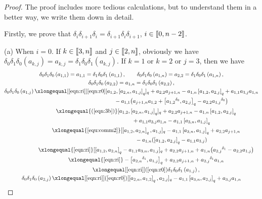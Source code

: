 \documentclass[pdftex]{sigma}
\numberwithin{equation}{section}
\def\lr#1{\left[#1\right]}
\def\lrb#1{\left(#1\right)}
\def\d{\delta}
\def\lbb#1{\left[\kern-0.15em\left[ {#1} \right] \kern-0.15em\right]}
\begin{document}
\begin{proof}
The proof includes more tedious calculations, but to understand them
in a better way, we write them down in detail.

Firstly, we prove that $\d_i\d_{i+1}\d_i=\d_{i+1 }\d_i\d_{i+1}$, $i \in \lbb{0,n-2}$.

(a) When $i=0$.
If $k \in \lbb{3,n}$ and $j\in\lbb{2,n}$, obviously we have
$\d_0\d_1\d_0\lrb{a_{k,j}}=a_{k,j}=\d_1\d_0\d_1\lrb{a_{k,j}}$.
If $k=1$ or $k=2$ or $j=3$, then we have
\begin{gather*}
 \d_0\d_1\d_0\lrb{a_{1,1}} =a_{1,1}=\d_1\d_0\d_1\lrb{a_{1,1}},\qquad
 \d_0\d_1\d_0\lrb{a_{1,n}}=a_{2,2}=\d_1\d_0\d_1\lrb{a_{1,n}},\\
 \d_0\d_1\d_0\lrb{a_{2,2}}=a_{1,n}=\d_1\d_0\d_1\lrb{a_{2,2}},\\
 \d_0\d_1\d_0\lrb{a_{1,j}}
 \xlongequal[\eqref{eqn:ri}]{\eqref{eqn:r0}} [a_{1,2},\lr{a_{2,n}, a_{1,j}}_q]_q+a_{2,2}a_{j+1,n}-a_{1,n}\lr{a_{1,2}, a_{2,j}}_q +a_{1,1}a_{3,j}a_{1,n} \\
\phantom{ \d_0\d_1\d_0\lrb{a_{1,j}}\xlongequal{\qquad}}{} -a_{1,1}\bigl(a_{j+1,n}a_{1,2}+\bigl[{a_{1,2}}^{\d_0}, a_{2,j}\bigr]_q -a_{2,2}{a_{1,j}}^{\d_0}\bigr) \\
 \phantom{ \d_0\d_1\d_0\lrb{a_{1,j}}}{} \xlongequal{\lrb{\ref{eqn:3b}}} [a_{1,2},\lr{a_{2,n}, a_{1,j}}_q]_q+a_{2,2}a_{j+1,n}-a_{1,n}\lr{a_{1,2}, a_{2,j}}_q \\
 \phantom{ \d_0\d_1\d_0\lrb{a_{1,j}}\xlongequal{\qquad}}{} +a_{1,1}a_{3,j}a_{1,n}-a_{1,1}\lr{a_{3,n}, a_{1,j}}_q\\
 \phantom{ \d_0\d_1\d_0\lrb{a_{1,j}}}{} \xlongequal{\eqref{equ:comm2}} [\lr{a_{1,2}, a_{2,n}}_q, a_{1,j}]_q-a_{1,1}\lr{a_{3,n}, a_{1,j}}_q+a_{2,2}a_{j+1,n}\\
 \phantom{ \d_0\d_1\d_0\lrb{a_{1,j}}\xlongequal{\qquad}}{} -a_{1,n}(\lr{a_{1,2}, a_{2,j}}_q-a_{1,1}a_{3,j}) \\
 \phantom{ \d_0\d_1\d_0\lrb{a_{1,j}}}{} \xlongequal{\eqref{eqn:ri}} [\lr{a_{1,2}, a_{2,n}}_q -a_{1,1} a_{3,n}, a_{1,j}]_q +a_{2,2}a_{j+1,n}+a_{1,n}\bigl({a_{2,j}}^{\d_1}-a_{2,2} a_{1,j}\bigr) \\
 \phantom{ \d_0\d_1\d_0\lrb{a_{1,j}}}{} \xlongequal{\eqref{eqn:ri}} -\bigl[{a_{2,n}}^{\d_1}, a_{1,j}\bigr]_q+a_{2,2}a_{j+1,n}+{a_{2,j}}^{\d_1}a_{1,n}\\
 \phantom{ \d_0\d_1\d_0\lrb{a_{1,j}}}{} \xlongequal[\eqref{eqn:ri}]{\lrb{\ref{eqn:r0}}} \d_1\d_0\d_1\lrb{a_{1,j}},\\
 \d_0\d_1\d_0\lrb{a_{2,j}} \xlongequal[\eqref{eqn:ri}]{\lrb{\ref{eqn:r0}}} [\lr{a_{2,n}, a_{1,2}}_q, a_{2,j}]_q -a_{1,1}\lr{a_{3,n}, a_{2,j}}_q +a_{3,j} a_{1,n} \\

\end{gather*}
\end{proof}
\end{document}

